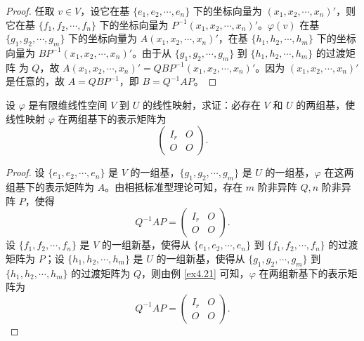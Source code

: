 \documentclass[lang=cn,12pt]{elegantbook}
\begin{document}
\begin{proof}
    任取 \(v \in V\)，设它在基 \(\{e_1, e_2, \cdots, e_n\}\) 下的坐标向量为 \((x_1, x_2, \cdots, x_n)'\)，则它在基 \(\{f_1, f_2, \cdots, f_n\}\) 下的坐标向量为 \(P^{-1}(x_1, x_2, \cdots, x_n)'\)。\(\varphi(v)\) 在基 \(\{g_1, g_2, \cdots, g_m\}\) 下的坐标向量为 \(A(x_1, x_2, \cdots, x_n)'\)，在基 \(\{h_1, h_2, \cdots, h_m\}\) 下的坐标向量为 \(BP^{-1}(x_1, x_2, \cdots, x_n)'\)。由于从 \(\{g_1, g_2, \cdots, g_m\}\) 到 \(\{h_1, h_2, \cdots, h_m\}\) 的过渡矩阵
    为 \(Q\)，故 \(A(x_1, x_2, \cdots, x_n)' = QBP^{-1}(x_1, x_2, \cdots, x_n)'\)。因为 \((x_1, x_2, \cdots, x_n)'\) 是任意的，故 \(A = QBP^{-1}\)，即 \(B = Q^{-1}AP\)。
\end{proof}


\begin{example}\label{ex4.22}
    设 \(\varphi\) 是有限维线性空间 \(V\) 到 \(U\) 的线性映射，求证：必存在 \(V\) 和 \(U\) 的两组基，使线性映射 \(\varphi\) 在两组基下的表示矩阵为  
    \[
    \begin{pmatrix} 
    I_r & O \\ 
    O & O 
    \end{pmatrix}.
    \]
\end{example}
    
\begin{proof}
    设 \(\{e_1, e_2, \cdots, e_n\}\) 是 \(V\) 的一组基，\(\{g_1, g_2, \cdots, g_m\}\) 是 \(U\) 的一组基，\(\varphi\) 在这两组基下的表示矩阵为 \(A\)。由相抵标准型理论可知，存在 \(m\) 阶非异阵 \(Q, n\) 阶非异阵 \(P\)，使得  
    \[
    Q^{-1}AP = 
    \begin{pmatrix} 
    I_r & O \\ 
    O & O 
    \end{pmatrix}.
    \]  
    设 \(\{f_1, f_2, \cdots, f_n\}\) 是 \(V\) 的一组新基，使得从 \(\{e_1, e_2, \cdots, e_n\}\) 到 \(\{f_1, f_2, \cdots, f_n\}\) 的过渡矩阵为 \(P\)；设 \(\{h_1, h_2, \cdots, h_m\}\) 是 \(U\) 的一组新基，使得从 \(\{g_1, g_2, \cdots, g_m\}\) 到 \(\{h_1, h_2, \cdots, h_m\}\) 的过渡矩阵为 \(Q\)，则由例 \ref{ex4.21} 可知，\(\varphi\) 在两组新基下的表示矩阵为  
    \[
    Q^{-1}AP = 
    \begin{pmatrix} 
    I_r & O \\ 
    O & O 
    \end{pmatrix}.
    \]
\end{proof}

    
\end{document}
